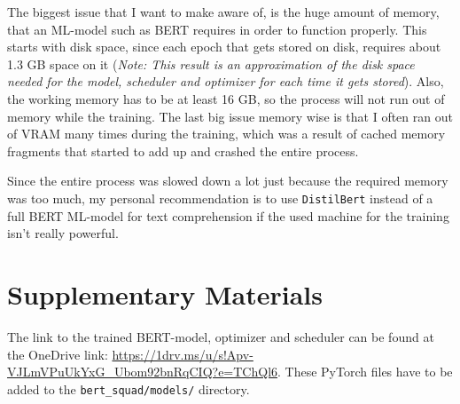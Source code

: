         The biggest issue that I want to make aware of, is the huge amount of memory, that an ML-model such as BERT requires in order to function properly. This starts with disk space, since each epoch that gets stored on disk, requires about 1.3 GB space on it (\emph{Note: This result is an approximation of the disk space needed for the model, scheduler and optimizer for each time it gets stored}).
        Also, the working memory has to be at least 16 GB, so the process will not run out of memory while the training.
        The last big issue memory wise is that I often ran out of VRAM many times during the training, which was a result of cached memory fragments that started to add up and crashed the entire process.

        Since the entire process was slowed down a lot just because the required memory was too much, my personal recommendation is to use \texttt{DistilBert} instead of a full BERT ML-model for text comprehension if the used machine for the training isn't really powerful.

    \section{Supplementary Materials}
    \label{sec:supplementary-materials}

        The link to the trained BERT-model, optimizer and scheduler can be found at the OneDrive link: \url{https://1drv.ms/u/s!Apv-VJLmVPuUkYxG_Ubom92bnRqCIQ?e=TChQl6}. 
        These PyTorch files have to be added to the \texttt{bert\_squad/models/} directory.


    \pagebreak

    
    


